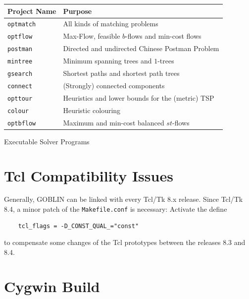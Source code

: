 \documentclass[a4paper,11pt,twoside]{book}
\begin{document}
\begin{multicols}{2}
\begin{tablehere}
\begin{center}
\begin{tabular}{|l|l|}
\hline
Project Name        & Purpose \\
\hline
\hline
\verb/optmatch/     & All kinds of matching problems \\
\hline
\verb/optflow/      & Max-Flow, feasible $b$-flows and min-cost flows \\
\hline
\verb/postman/      & Directed and undirected Chinese Postman Problem \\
\hline
\verb/mintree/      & Minimum spanning trees and $1$-trees \\
\hline
\verb/gsearch/      & Shortest paths and shortest path trees \\
\hline
\verb/connect/      & (Strongly) connected components \\
\hline
\verb/opttour/      & Heuristics and lower bounds for the (metric) TSP \\
\hline
\verb/colour/       & Heuristic colouring \\
\hline
\verb/optbflow/     & Maximum and min-cost balanced $st$-flows \\
\hline
\end{tabular}
\end{center}
\caption{\label{tlb_exe}Executable Solver Programs}
\end{tablehere}


\section{Tcl Compatibility Issues}

Generally, GOBLIN can be linked with every Tcl/Tk 8.x release. Since Tcl/Tk 8.4,
a minor patch of the \verb/Makefile.conf/ is necessary: Activate the define
\begin{verbatim}
    tcl_flags = -D_CONST_QUAL_="const"
\end{verbatim}
to compensate some changes of the Tcl prototypes between the releases 8.3 and
8.4.


\section{Cygwin Build}


\end{multicols}
\end{document}
